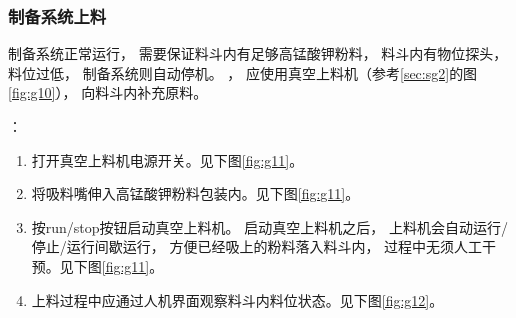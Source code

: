 \documentclass[UTF8,a4paper,12pt,titlepage]{ctexart}
\begin{document}
      \subsubsection{制备系统上料}
         制备系统正常运行，
         需要保证料斗内有足够高锰酸钾粉料，
         料斗内有物位探头，
         料位过低，
         制备系统则自动停机。
         ，
         应使用真空上料机（参考\ref{sec:sg2}的图\ref{fig:g10}），
         向料斗内补充原料。

         ：
         \begin{enumerate}
            \item 打开真空上料机电源开关。见下图\ref{fig:g11}。
            \item 将吸料嘴伸入高锰酸钾粉料包装内。见下图\ref{fig:g11}。
            \item 按run/stop按钮启动真空上料机。
            启动真空上料机之后，
            上料机会自动运行/停止/运行间歇运行，
            方便已经吸上的粉料落入料斗内，
            过程中无须人工干预。见下图\ref{fig:g11}。
            \item 上料过程中应通过人机界面观察料斗内料位状态。见下图\ref{fig:g12}。
         \end{enumerate}
\end{document}

